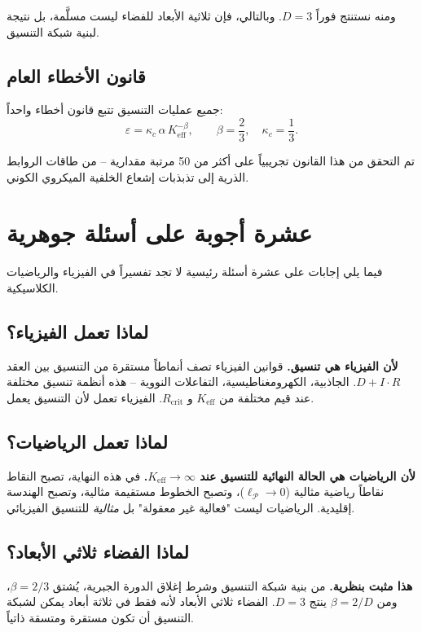 \documentclass[12pt,a4paper]{article}
\newcommand{\Keff}{K_{\mathrm{eff}}}
\newcommand{\kappac}{\kappa_c}
\newcommand{\eps}{\varepsilon}
\newcommand{\betaf}{\beta}
\newcommand{\Rcrit}{R_{\mathrm{crit}}}
\newcommand{\calP}{\mathcal{P}}
\begin{document}
	ومنه نستنتج فوراً \(D = 3\). وبالتالي، فإن ثلاثية الأبعاد للفضاء ليست مسلَّمة، بل نتيجة لبنية شبكة التنسيق.
	
	\subsection{قانون الأخطاء العام}
	
	جميع عمليات التنسيق تتبع قانون أخطاء واحداً:
	\[
	\eps = \kappac\,\alpha\,\Keff^{-\betaf}, \qquad \betaf = \frac{2}{3}, \quad \kappac = \frac{1}{3}.
	\]
	
	تم التحقق من هذا القانون تجريبياً على أكثر من 50 مرتبة مقدارية – من طاقات الروابط الذرية إلى تذبذبات إشعاع الخلفية الميكروي الكوني.
	
	\section{عشرة أجوبة على أسئلة جوهرية}
	
	فيما يلي إجابات على عشرة أسئلة رئيسية لا تجد تفسيراً في الفيزياء والرياضيات الكلاسيكية.
	
	\subsection{لماذا تعمل الفيزياء؟}
	
	\textbf{لأن الفيزياء هي تنسيق.} قوانين الفيزياء تصف أنماطاً مستقرة من التنسيق بين العقد \(D+I\cdot R\). الجاذبية، الكهرومغناطيسية، التفاعلات النووية – هذه أنظمة تنسيق مختلفة عند قيم مختلفة من \(\Keff\) و \(\Rcrit\). الفيزياء تعمل لأن التنسيق يعمل.
	
	\subsection{لماذا تعمل الرياضيات؟}
	
	\textbf{لأن الرياضيات هي الحالة النهائية للتنسيق عند \(\Keff \to \infty\).} في هذه النهاية، تصبح النقاط نقاطاً رياضية مثالية (\(\ell_{\calP} \to 0\))، وتصبح الخطوط مستقيمة مثالية، وتصبح الهندسة إقليدية. الرياضيات ليست "فعالية غير معقولة" بل \emph{مثالية} للتنسيق الفيزيائي.
	
	\subsection{لماذا الفضاء ثلاثي الأبعاد؟}
	
	\textbf{هذا مثبت بنظرية.} من بنية شبكة التنسيق وشرط إغلاق الدورة الجبرية، يُشتق \(\betaf = 2/3\)، ومن \(\betaf = 2/D\) ينتج \(D=3\). الفضاء ثلاثي الأبعاد لأنه فقط في ثلاثة أبعاد يمكن لشبكة التنسيق أن تكون مستقرة ومتسقة ذاتياً.
	
\end{document}
